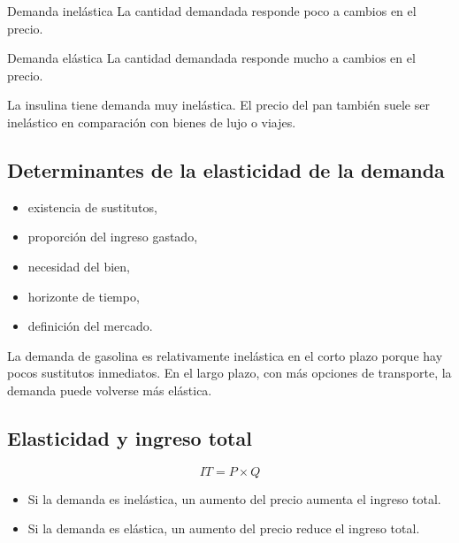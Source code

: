 \begin{concepto}{Demanda inelástica}
La cantidad demandada responde poco a cambios en el precio.
\end{concepto}

\begin{concepto}{Demanda elástica}
La cantidad demandada responde mucho a cambios en el precio.
\end{concepto}

\begin{ejemplo}
La insulina tiene demanda muy inelástica. El precio del pan también suele ser inelástico en comparación con bienes de lujo o viajes.
\end{ejemplo}

\subsection{Determinantes de la elasticidad de la demanda}

\begin{itemize}
    \item existencia de sustitutos,
    \item proporción del ingreso gastado,
    \item necesidad del bien,
    \item horizonte de tiempo,
    \item definición del mercado.
\end{itemize}

\begin{ejemplo}
La demanda de gasolina es relativamente inelástica en el corto plazo porque hay pocos sustitutos inmediatos. En el largo plazo, con más opciones de transporte, la demanda puede volverse más elástica.
\end{ejemplo}

\subsection{Elasticidad y ingreso total}

\begin{equation}
IT = P \times Q
\end{equation}

\begin{itemize}
    \item Si la demanda es inelástica, un aumento del precio aumenta el ingreso total.
    \item Si la demanda es elástica, un aumento del precio reduce el ingreso total.
\end{itemize}

